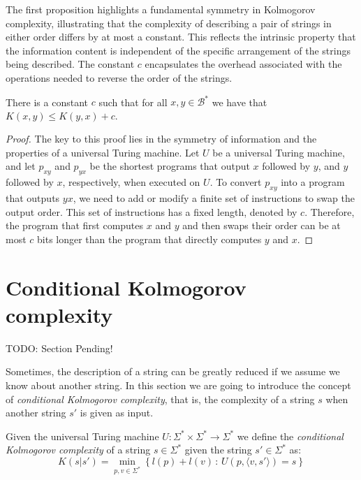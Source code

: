The first proposition highlights a fundamental symmetry in Kolmogorov complexity, illustrating that the complexity of describing a pair of strings in either order differs by at most a constant. This reflects the intrinsic property that the information content is independent of the specific arrangement of the strings being described. The constant \(c\) encapsulates the overhead associated with the operations needed to reverse the order of the strings.

\begin{proposition}
\label{prop:kolmogorov_order}
There is a constant $c$ such that for all $x, y \in\mathcal{B}^{\ast}$ we have that $K(x, y) \leq K(y, x) + c$.
\end{proposition}
\begin{proof}
The key to this proof lies in the symmetry of information and the properties of a universal Turing machine. Let $U$ be a universal Turing machine, and let $p_{xy}$ and $p_{yx}$ be the shortest programs that output $x$ followed by $y$, and $y$ followed by $x$, respectively, when executed on $U$. To convert $p_{xy}$ into a program that outputs $yx$, we need to add or modify a finite set of instructions to swap the output order. This set of instructions has a fixed length, denoted by $c$. Therefore, the program that first computes $x$ and $y$ and then swaps their order can be at most $c$ bits longer than the program that directly computes $y$ and $x$.
\end{proof}

%
%

\section{Conditional Kolmogorov complexity}

{\color{red} TODO: Section Pending!}

Sometimes, the description of a string can be greatly reduced if we assume we know about another string. In this section we are going to introduce the concept of \emph{conditional Kolmogorov complexity}, that is, the complexity of a string $s$ when another string $s'$ is given as input.

\begin{definition}
Given the universal Turing machine $U:\Sigma^{\ast}\times\Sigma^{\ast}\rightarrow\Sigma^{\ast}$ we define the \emph{conditional Kolmogorov complexity} of a string $s\in\Sigma^{\ast}$ given the string $s'\in\Sigma^{\ast}$ as:
\[
K(s|s')=\min_{p,v\in\Sigma^{\ast}}\left\{l(p) + l(v)\,:\, U(p,\langle v, s' \rangle)=s\right\}
\]
\end{definition}

